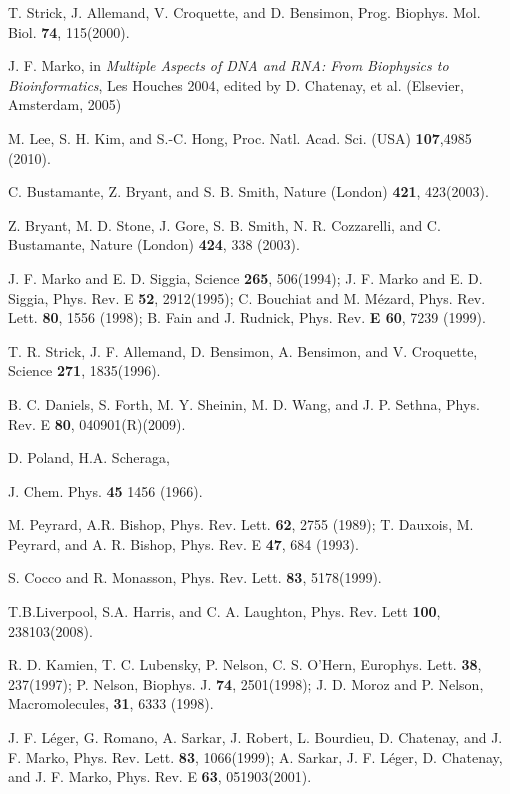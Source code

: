 \documentclass[pre,showpacs,twocolumn,superscriptaddress]{revtex4}
\begin{document}
\begin{thebibliography}{99} 
T. Strick, J. Allemand, V. Croquette, and D. Bensimon,
Prog. Biophys. Mol. Biol. {\bf74}, 115(2000).

J. F. Marko, 
in {\it Multiple Aspects of DNA and RNA: From Biophysics to
	Bioinformatics},
 Les Houches 2004, 
edited by D. Chatenay, et al.
(Elsevier, Amsterdam, 2005) 

M. Lee, S. H. Kim, and S.-C. Hong,
Proc. Natl. Acad. Sci. (USA) {\bf 107},4985 (2010).

C. Bustamante, Z. Bryant, and S. B. Smith,
Nature (London) {\bf 421},
423(2003).

Z. Bryant, M. D. Stone, J. Gore, 
S. B. Smith, N. R. Cozzarelli, and C. Bustamante,
Nature (London) {\bf424}, 338 (2003).

J. F.  Marko and  E. D. Siggia, 
Science {\bf 265}, 506(1994);
J. F.  Marko and  E. D. Siggia, 
Phys. Rev. E {\bf 52}, 2912(1995);
C. Bouchiat and M. M\'{e}zard,
Phys. Rev. Lett. {\bf 80}, 1556 (1998);
B. Fain and J. Rudnick,
Phys. Rev. {\bf E 60}, 7239 (1999).

T. R. Strick, J. F. Allemand, D. Bensimon, A. Bensimon, and V. Croquette, 
Science {\bf 271}, 1835(1996).

B. C. Daniels, S. Forth, M. Y. Sheinin, M. D. Wang, and J. P. Sethna, 
Phys. Rev. E {\bf 80}, 040901(R)(2009).

D. Poland, H.A. Scheraga, 
	
J. Chem. Phys. {\bf 45} 1456 (1966).

 M. Peyrard, A.R. Bishop, 
Phys. Rev. Lett. {\bf 62}, 2755 (1989);
T. Dauxois, M. Peyrard, and A. R. Bishop, 
Phys. Rev. E {\bf 47}, 684 (1993).


S. Cocco and R. Monasson,
Phys. Rev. Lett. {\bf 83},
5178(1999).

T.B.Liverpool, S.A. Harris, and C. A. Laughton,
Phys. Rev. Lett {\bf 100},
238103(2008).



R. D. Kamien, 
T. C. Lubensky,
P. Nelson,
C. S. O'Hern,
Europhys. Lett. {\bf 38},
237(1997);
P. Nelson,
Biophys. J. {\bf 74}, 2501(1998);
J. D. Moroz and P. Nelson,
Macromolecules, {\bf 31}, 6333 (1998).

J. F. L\'{e}ger, G. Romano, A. Sarkar, J. Robert, L. Bourdieu, D. Chatenay, and J. F. Marko,
Phys. Rev. Lett. {\bf 83}, 1066(1999);
A. Sarkar, J. F. L\'{e}ger, D. Chatenay, and J. F. Marko,
Phys. Rev. E {\bf 63}, 051903(2001).


\end{thebibliography}
\end{document}
